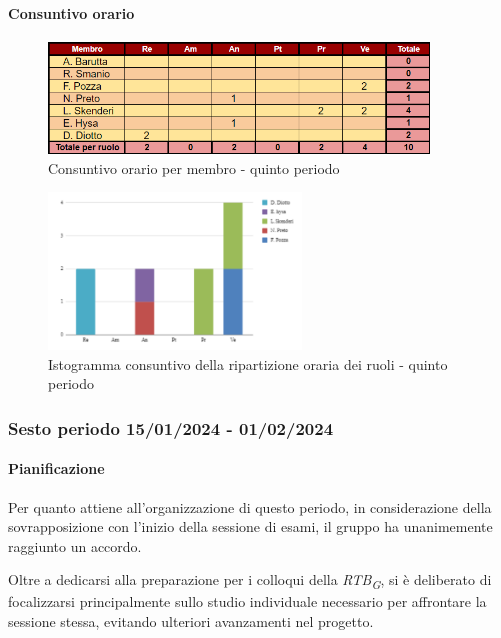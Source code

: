 \paragraph{Consuntivo orario}

\begin{figure}[H]
    \centering
    \includegraphics[width=0.9\textwidth]{../Images/consuntivoOrario5Periodo.png}
    \caption{Consuntivo orario per membro - quinto periodo}
    \label{fig:Constuntivo_orario_5}
\end{figure}

\begin{figure}[H]
    \centering
    \includegraphics[width=0.6\textwidth]{../Images/consuntivoDivisioneRuoli5Periodo.png}
    \caption{Istogramma consuntivo della ripartizione oraria dei ruoli - quinto periodo}
    \label{fig:Consuntivo_ripartizione_oraria_5}
\end{figure}


\subsubsection{Sesto periodo  15/01/2024 - 01/02/2024}
\paragraph{Pianificazione}
Per quanto attiene all'organizzazione di questo periodo, in considerazione della sovrapposizione con l'inizio della sessione di esami, il gruppo ha unanimemente raggiunto un accordo.

Oltre a dedicarsi alla preparazione per i colloqui della \textit{RTB}\textsubscript{\textit{G}}, si è deliberato di focalizzarsi principalmente sullo studio individuale necessario per affrontare la sessione stessa, evitando ulteriori avanzamenti nel progetto.

